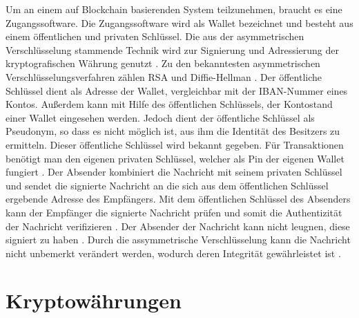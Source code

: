 Um an einem auf Blockchain basierenden System teilzunehmen, braucht es eine Zugangssoftware. Die Zugangssoftware wird als Wallet bezeichnet und besteht aus einem öffentlichen und privaten Schlüssel. Die aus der asymmetrischen Verschlüsselung stammende Technik wird zur Signierung und Adressierung der kryptografischen Währung genutzt \cite{stallings}. Zu den bekanntesten asymmetrischen Verschlüsselungsverfahren zählen RSA und Diffie-Hellman \cite{RSADH}.
Der öffentliche Schlüssel dient als Adresse der Wallet, vergleichbar mit der IBAN-Nummer eines Kontos. Außerdem kann mit Hilfe des öffentlichen Schlüssels, der Kontostand einer Wallet eingesehen werden. Jedoch dient der öffentliche Schlüssel als Pseudonym, so dass es nicht möglich ist, aus ihm die Identität des Besitzers zu ermitteln. Dieser öffentliche Schlüssel wird bekannt gegeben. Für Transaktionen benötigt man den eigenen privaten Schlüssel, welcher als Pin der eigenen Wallet fungiert \cite{priv}. Der Absender kombiniert die Nachricht mit seinem privaten Schlüssel und sendet die signierte Nachricht an die sich aus dem öffentlichen Schlüssel ergebende Adresse des Empfängers. Mit dem öffentlichen Schlüssel des Absenders kann der Empfänger die signierte Nachricht prüfen und somit die Authentizität der Nachricht verifizieren \cite{badev}. Der Absender der Nachricht kann nicht leugnen, diese signiert zu haben \cite{franco}. Durch die assymmetrische Verschlüsselung kann die Nachricht nicht unbemerkt verändert werden, wodurch deren Integrität gewährleistet ist \cite{stallings}.
	
	\section{Kryptowährungen}
	
